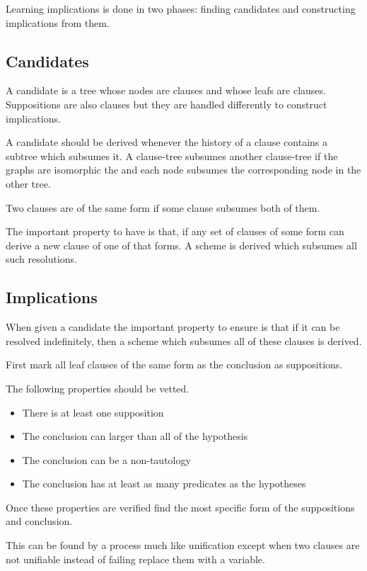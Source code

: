 \documentclass{article}
\begin{document}
Learning implications is done in two phases: finding candidates and constructing implications from them.
 
\subsection{Candidates}

A candidate is a tree whose nodes are clauses and whose leafs are clauses.
Suppositions are also clauses but they are handled differently to construct implications.
  
A candidate should be derived whenever the history of a clause contains a subtree which subsumes it.
A clause-tree subsumes another clause-tree
  if the graphs are isomorphic the and each node subsumes the corresponding node in the other tree.

Two clauses are of the same form if some clause subsumes both of them.

The important property to have is that,
if any set of clauses of some form can derive a new clause of one of that forms.
A scheme is derived which subsumes all such resolutions.

\subsection{Implications}

When given a candidate the important property to ensure is that if it can be resolved indefinitely,
then a scheme which subsumes all of these clauses is derived.

First mark all leaf clauses of the same form as the conclusion as suppositions.

The following properties should be vetted.
\begin{itemize}
  \item There is at least one supposition
  \item The conclusion can larger than all of the hypothesis
  \item The conclusion can be a non-tautology
  \item The conclusion has at least as many predicates as the hypotheses
\end{itemize}

Once these properties are verified find the most specific form of the suppositions and conclusion.

This can be found by a process much like unification except when two clauses are not unifiable instead 
  of failing replace them with a variable.
\end{document}
